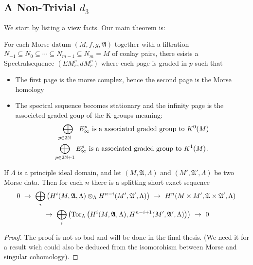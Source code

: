\subsection*{A Non-Trivial $d_3$}

We start by listing a view facts. Our main theorem is: 
\begin{theorem}
	For each Morse datum $(M,f,g,\mathfrak{A})$ together with a filtration $N_{-1}\subseteq N_0 \subseteq \cdots \subseteq N_{m-1} \subseteq N_m=M$ of conlay pairs, there esists a Spectralsequence $(EM^p_r,dM^p_r)$ where each page is graded in $p$ such that
	\begin{itemize}
		\item The first page is the morse complex, hence the second page is the Morse homology
		\item The spectral sequence becomes stationary and the infinity page is the associeted graded goup of the K-groups meaning:
		\begin{align*}
			\bigoplus_{p\in 2\mathbb{N}\phantom{+1}} E_\infty ^p \text{ is a associated graded group to }K^0(M) \\
			\bigoplus_{p\in 2\mathbb{N}+1} E_\infty ^p \text{ is a associated graded group to }K^1(M)\,.
		\end{align*}
	\end{itemize}
	\end{theorem}

\begin{theorem}
		If $\Lambda$ is a principle ideal domain, and let $(M,\mathfrak{A},\Lambda)$ and $(M',\mathfrak{A}',\Lambda)$ be two Morse data. Then for each $n$ there is a splitting short exact sequence 
	\begin{multline*}
		0~\to ~
		\bigoplus_i\left(H^i(M,\mathfrak{A},\Lambda)\otimes_\Lambda H^{n-i}(M',\mathfrak{A}',\Lambda)\right) ~\to~
		H^n(M\times M',\mathfrak{A}\times \mathfrak{A}',\Lambda) \\
		~	\to ~
		\bigoplus_i\left(\operatorname{\mathrm{Tor}}_{\Lambda}\left(
		H^i(M,\mathfrak{A},\Lambda),H^{n-i+1}(M',\mathfrak{A}',\Lambda)
		\right) \right)~ \to ~0
	\end{multline*}
\end{theorem}
\begin{proof}
    The proof is not so bad and will be done in the final thesis. (We need it for a result wich could also be deduced from the isomorohism between Morse and singular cohomology).
\end{proof}

